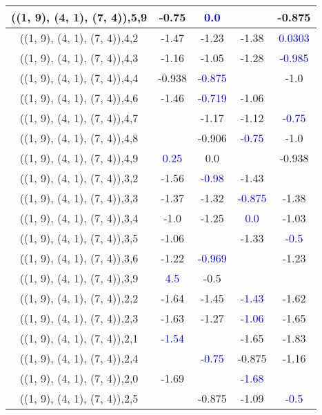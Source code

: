 \documentclass{article}
\begin{document}
\begin{center}
\begin{longtable}{|c|c|c|c|c|}
        	\hline
        	((1, 9), (4, 1), (7, 4)),5,9&-0.75& \textcolor{blue}{0.0}&&-0.875\\
        	\hline
        	((1, 9), (4, 1), (7, 4)),4,2&-1.47&-1.23&-1.38& \textcolor{blue}{0.0303}\\
        	\hline
        	((1, 9), (4, 1), (7, 4)),4,3&-1.16&-1.05&-1.28& \textcolor{blue}{-0.985}\\
        	\hline
        	((1, 9), (4, 1), (7, 4)),4,4&-0.938& \textcolor{blue}{-0.875}&&-1.0\\
        	\hline
        	((1, 9), (4, 1), (7, 4)),4,6&-1.46& \textcolor{blue}{-0.719}&-1.06&\\
        	\hline
        	((1, 9), (4, 1), (7, 4)),4,7&&-1.17&-1.12& \textcolor{blue}{-0.75}\\
        	\hline
        	((1, 9), (4, 1), (7, 4)),4,8&&-0.906& \textcolor{blue}{-0.75}&-1.0\\
        	\hline
        	((1, 9), (4, 1), (7, 4)),4,9& \textcolor{blue}{0.25}&0.0&&-0.938\\
        	\hline
        	((1, 9), (4, 1), (7, 4)),3,2&-1.56& \textcolor{blue}{-0.98}&-1.43&\\
        	\hline
        	((1, 9), (4, 1), (7, 4)),3,3&-1.37&-1.32& \textcolor{blue}{-0.875}&-1.38\\
        	\hline
        	((1, 9), (4, 1), (7, 4)),3,4&-1.0&-1.25& \textcolor{blue}{0.0}&-1.03\\
        	\hline
        	((1, 9), (4, 1), (7, 4)),3,5&-1.06&&-1.33& \textcolor{blue}{-0.5}\\
        	\hline
        	((1, 9), (4, 1), (7, 4)),3,6&-1.22& \textcolor{blue}{-0.969}&&-1.23\\
        	\hline
        	((1, 9), (4, 1), (7, 4)),3,9& \textcolor{blue}{4.5}&-0.5&&\\
        	\hline
        	((1, 9), (4, 1), (7, 4)),2,2&-1.64&-1.45& \textcolor{blue}{-1.43}&-1.62\\
        	\hline
        	((1, 9), (4, 1), (7, 4)),2,3&-1.63&-1.27& \textcolor{blue}{-1.06}&-1.65\\
        	\hline
        	((1, 9), (4, 1), (7, 4)),2,1& \textcolor{blue}{-1.54}&&-1.65&-1.83\\
        	\hline
        	((1, 9), (4, 1), (7, 4)),2,4&& \textcolor{blue}{-0.75}&-0.875&-1.16\\
        	\hline
        	((1, 9), (4, 1), (7, 4)),2,0&-1.69&& \textcolor{blue}{-1.68}&\\
        	\hline
        	((1, 9), (4, 1), (7, 4)),2,5&&-0.875&-1.09& \textcolor{blue}{-0.5}\\

\end{longtable}
\end{center}
\end{document}
